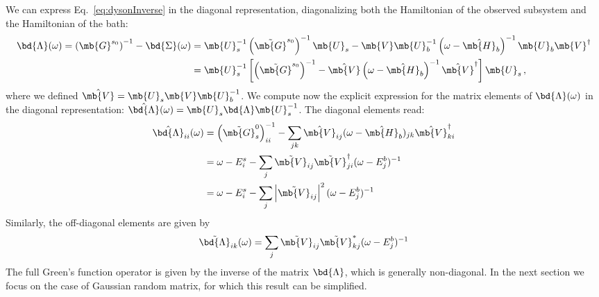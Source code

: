 We can express Eq.~\ref{eq:dysonInverse} in the diagonal representation, diagonalizing both the Hamiltonian of the observed subsystem and the Hamiltonian of the bath:
\begin{align}
\bd{\Lambda}(\omega) = \left(\mb{G}^{s_0}\right)^{-1} - \bd{\Sigma}(\omega)
& =
\mb{U}_s^{-1} \left(\Tilde{\mb{G}}^{s_0}\right)^{-1} \mb{U}_s -
\mb{V} \mb{U}_b^{-1} \left(\omega-\hat{\mb{H}}_b\right)^{-1} \mb{U}_b \mb{V}^\dagger
\\
& = \mb{U}_s^{-1} \left[ \left(\Tilde{\mb{G}}^{s_0}\right)^{-1} - \hat{\mb{V}} \left(\omega-\hat{\mb{H}}_b\right)^{-1} \hat{\mb{V}}^\dagger \right] \mb{U}_s \,,
\end{align}
where we defined $\hat{\mb{V}} = \mb{U}_s \mb{V} \mb{U}_b^{-1}$. We compute now the explicit expression for the matrix elements of $\bd{\Lambda}(\omega)$ in the diagonal representation: $\hat{\bd{\Lambda}} (\omega) = \mb{U}_s \bd{\Lambda} \mb{U}_s^{-1} $.
The diagonal elements read:
\begin{align}
    \hat{\bd{\Lambda}}_{ii} (\omega)
    & = \left(\Tilde{\mb{G}}^0_s\right)^{-1}_{ii} - \sum_{jk} \hat{\mb{V}}_{ij}(\omega-\hat{\mb{H}}_b)_{jk} \hat{\mb{V}}^\dagger_{ki}
    \\
    &=
    \omega - E^s_i - \sum_j \Tilde{\mb{V}}_{ij} \Tilde{\mb{V}}^\dagger_{ji} (\omega-E^b_j)^{-1}
    \\
    &=
    \omega - E^s_i - \sum_j \left| \Tilde{\mb{V}}_{ij} \right|^2 (\omega-E^b_j)^{-1}
    \label{eq:Lambdadiagonal}
\end{align}
Similarly, the off-diagonal elements are given by
\begin{align}
    \Tilde{\bd{\Lambda}}_{ik} (\omega) =
    \sum_j \Tilde{\mb{V}}_{ij} \Tilde{\mb{V}}^*_{kj} (\omega-E^b_j)^{-1}
    \label{eq:Lambdaoffdiagonal}
\end{align}
The full Green's function operator is given by the inverse of the matrix $\bd{\Lambda}$, which is generally non-diagonal. In the next section we focus on the case of Gaussian random matrix, for which this result can be simplified.


